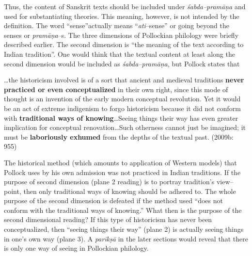 Thus, the content of Sanskrit texts should be included under \textit{śabda–pramāṇa} and used for substantiating theories. This meaning, however, is not intended by the definition. The word “sense”actually means “\textit{ati}–sense” or going beyond the senses or \textit{pramāṇa}–s. The three dimensions of Pollockian philology were briefly described earlier. The second dimension is “the meaning of the text according to Indian tradition”. One would think that the textual content at least along the second dimension would be included as \textit{śabda–pramāṇa}, but Pollock states that

\begin{myquote}
…the historicism involved is of a sort that ancient and medieval traditions \textbf{never practiced or even conceptualized }in their own right, since this mode of thought is an invention of the early modern conceptual revolution. Yet it would be an act of extreme indigenism to forgo historicism because it did not conform with \textbf{traditional ways of knowing}…Seeing things their way has even greater implication for conceptual renovation…Such otherness cannot just be imagined; it must be\textbf{ laboriously exhumed} from the depths of the textual past. (2009b: 955)
\end{myquote}

The historical method (which amounts to application of Western models) that Pollock uses by his own admission was not practiced in Indian traditions. If the purpose of second dimension (plane 2 reading) is to portray tradition’s view–point, then only traditional ways of knowing should be adhered to. The whole purpose of the second dimension is defeated if the method used “does not conform with the traditional ways of knowing.” What then is the purpose of the second dimensional reading? If this type of historicism has never been conceptualized, then “seeing things their way” (plane 2) is actually seeing things in one’s own way (plane 3). A \textit{parīkṣā} in the later sections would reveal that there is only one way of seeing in Pollockian philology.

